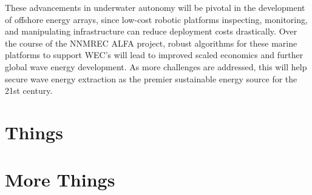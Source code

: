 \documentclass[double,12pt]{beavtex}
\begin{document}
These advancements in underwater autonomy will be pivotal in the development of offshore energy arrays, since low-cost robotic platforms inspecting, monitoring, and manipulating infrastructure can reduce deployment costs drastically. Over the course of the NNMREC ALFA project, robust algorithms for these marine platforms to support WEC's will lead to improved scaled economics and further global wave energy development. As more challenges are addressed, this will help secure wave energy extraction as the premier sustainable energy source for the 21st century.

\pagebreak




\pagebreak

\appendix

\chapter{Things}





\chapter{More Things}
\end{document}
